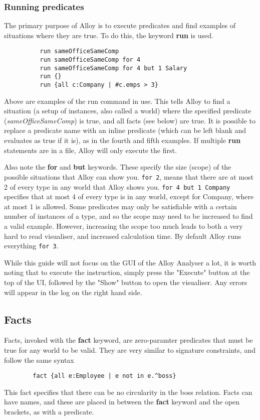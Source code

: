 \documentclass[10pt]{article}
\begin{document}
      \subsubsection*{Running predicates}
        The primary purpose of Alloy is to execute predicates and find examples of situations where they are true. To do this, the keyword \textbf{run} is used.
        \begin{lstlisting}
          run sameOfficeSameComp
          run sameOfficeSameComp for 4
          run sameOfficeSameComp for 4 but 1 Salary
          run {}
          run {all c:Company | #c.emps > 3}
        \end{lstlisting}\par
        Above are examples of the run command in use. This tells Alloy to find a situation (a setup of instances, also called a world) where the specified predicate (\textit{sameOfficeSameComp}) is true, and all facts (see below) are true. It is possible to replace a predicate name with an inline predicate (which can be left blank and evaluates as true if it is), as in the fourth and fifth examples. If multiple \textbf{run} statements are in a file, Alloy will only execute the first.\par
        Also note the \textbf{for} and \textbf{but} keywords. These specify the size (scope) of the possible situations that Alloy can show you. \lstinline|for 2|, means that there are at most 2 of every type in any world that Alloy shows you. \lstinline|for 4 but 1 Company| specifies that at most 4 of every type is in any world, except for Company, where at most 1 is allowed. Some predicates may only be satisfiable with a certain number of instances of a type, and so the scope may need to be increased to find a valid example. However, increasing the scope too much leads to both a very hard to read visualiser, and increased calculation time. By default Alloy runs everything \lstinline|for 3|.\par
        While this guide will not focus on the GUI of the Alloy Analyser a lot, it is worth noting that to execute the instruction, simply press the "Execute" button at the top of the UI, followed by the "Show" button to open the visualiser. Any errors will appear in the log on the right hand side.
    \subsection*{Facts}
      Facts, invoked with the \textbf{fact} keyword, are zero-paramter predicates that must be true for any world to be valid. They are very similar to signature constraints, and follow the same syntax
      \begin{lstlisting}
        fact {all e:Employee | e not in e.^boss}
      \end{lstlisting}\par
      This fact specifies that there can be no circularity in the boss relation. Facts can have names, and these are placed in between the \textbf{fact} keyword and the open brackets, as with a predicate.
\end{document}
